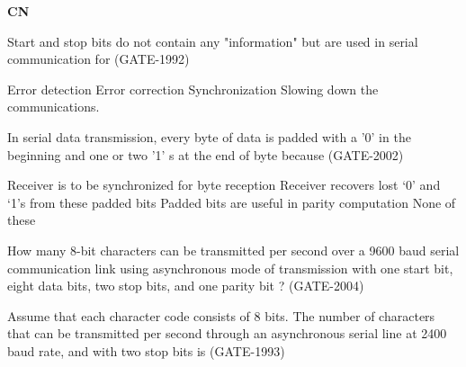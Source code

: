 

\centerline{\textbf{ \LARGE CN }}

\begin{questyle}
  \question  Start and stop bits do not contain any "information" but are used in serial communication for  (GATE-1992)

  \begin{choices}
    \choice         Error detection
    \choice         Error correction
    \CorrectChoice  Synchronization
    \choice         Slowing down the communications.
  \end{choices}
\end{questyle}

\begin{questyle}
  \question  In serial data transmission, every byte of data is padded with a '0' in the beginning and
             one or two '1' s at the end of byte because  (GATE-2002)

  \begin{choices}
    \CorrectChoice  Receiver is to be synchronized for byte reception
    \choice         Receiver recovers lost ‘0’ and ‘1’s from these padded bits
    \choice         Padded bits are useful in parity computation
    \choice         None of these
  \end{choices}
\end{questyle}

\begin{questyle}
  \question  How many 8-bit characters can be transmitted per second over a 9600 baud serial
  communication link using asynchronous mode of transmission with one start bit, eight data bits,
  two stop bits, and one parity bit ?  (GATE-2004)

  \begin{oneparchoices}
  \end{oneparchoices}
\end{questyle}

\begin{questyle}
  \question  Assume that each character code consists of 8 bits. The number of characters that can be
  transmitted per second through an asynchronous serial line at 2400 baud rate, and with two stop bits is  (GATE-1993)

  \begin{choices}
  \end{choices}
\end{questyle}

